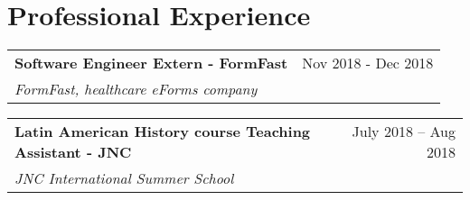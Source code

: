 
\section{Professional Experience}

\begin{tabularx}{\linewidth}{@{}l r@{}}
\textbf{Software Engineer Extern - FormFast}     &   \hspace{68mm} Nov 2018 - Dec 2018 \\[3.75pt]
\textit{FormFast, healthcare eForms company} \\
\end{tabularx}


\begin{tabularx}{\linewidth}{@{}l r@{}}
\textbf{Latin American History course Teaching Assistant - JNC}     &   \hspace{25.5mm} July 2018 – Aug 2018 \\[3.75pt]
\textit{JNC International Summer School} \\
\end{tabularx}
